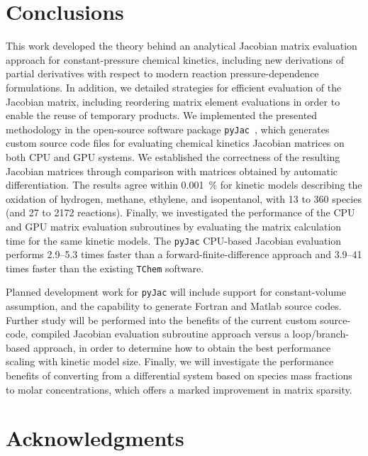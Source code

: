 \documentclass[preprint,12pt]{elsarticle}
\begin{document}
{\section{Conclusions}
\label{S:conclusions}

This work developed the theory behind an analytical Jacobian matrix evaluation approach for constant-pressure chemical kinetics, including new derivations of partial derivatives with respect to modern reaction pressure-dependence formulations.
In addition, we detailed strategies for efficient evaluation of the Jacobian matrix, including reordering matrix element evaluations in order to enable the reuse of temporary products.
We implemented the presented methodology in the open-source software package \texttt{pyJac}~\cite{Niemeyer:2015im}, which generates custom source code files for evaluating chemical kinetics Jacobian matrices on both CPU and GPU systems.
We established the correctness of the resulting Jacobian matrices through comparison with matrices obtained by automatic differentiation.
The results agree within \SI{0.001}{\percent} for kinetic models describing the oxidation of hydrogen, methane, ethylene, and isopentanol, with 13 to 360 species (and 27 to 2172 reactions).
Finally, we investigated the performance of the CPU and GPU matrix evaluation subroutines by evaluating the matrix calculation time for the same kinetic models.
The \texttt{pyJac} CPU-based Jacobian evaluation performs \numrange{2.9}{5.3} times faster than a forward-finite-difference approach and \numrange{3.9}{41} times faster than the existing \texttt{TChem} software.

Planned development work for \texttt{pyJac} will include support for constant-volume assumption, and the capability to generate Fortran and Matlab source codes.
Further study will be performed into the benefits of the current custom source-code, compiled Jacobian evaluation subroutine approach versus a loop\slash branch-based approach, in order to determine how to obtain the best performance scaling with kinetic model size.
Finally, we will investigate the performance benefits of converting from a differential system based on species mass fractions to molar concentrations, which offers a marked improvement in matrix sparsity.

\section*{Acknowledgments}

}
\end{document}

